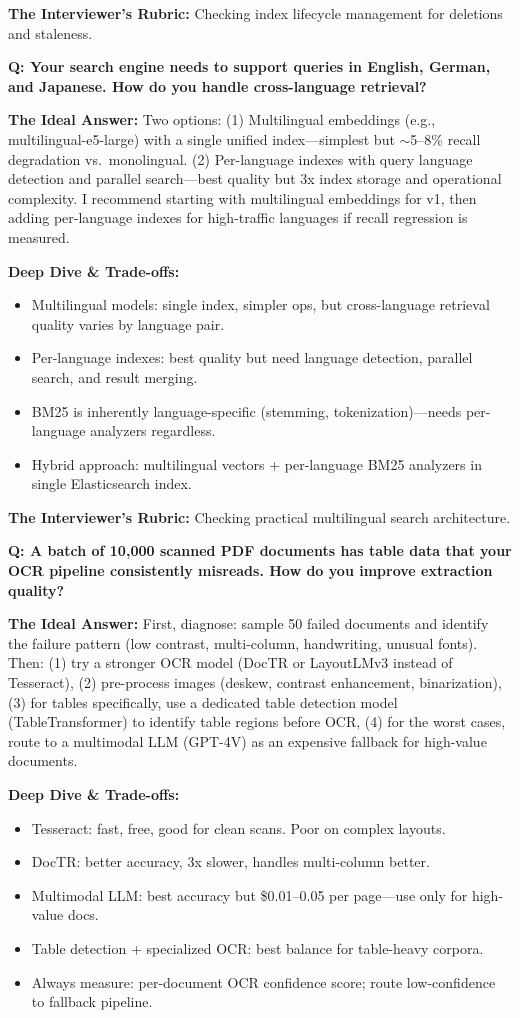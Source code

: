 \textbf{The Interviewer's Rubric:} Checking index lifecycle management for deletions and staleness.

\textbf{Q: Your search engine needs to support queries in English, German, and Japanese. How do you handle cross-language retrieval?}

\textbf{The Ideal Answer:} Two options: (1) Multilingual embeddings (e.g., multilingual-e5-large) with a single unified index---simplest but $\sim$5--8\% recall degradation vs.\ monolingual. (2) Per-language indexes with query language detection and parallel search---best quality but 3x index storage and operational complexity. I recommend starting with multilingual embeddings for v1, then adding per-language indexes for high-traffic languages if recall regression is measured.

\textbf{Deep Dive \& Trade-offs:}
\begin{itemize}
  \item Multilingual models: single index, simpler ops, but cross-language retrieval quality varies by language pair.
  \item Per-language indexes: best quality but need language detection, parallel search, and result merging.
  \item BM25 is inherently language-specific (stemming, tokenization)---needs per-language analyzers regardless.
  \item Hybrid approach: multilingual vectors + per-language BM25 analyzers in single Elasticsearch index.
\end{itemize}

\textbf{The Interviewer's Rubric:} Checking practical multilingual search architecture.

\textbf{Q: A batch of 10,000 scanned PDF documents has table data that your OCR pipeline consistently misreads. How do you improve extraction quality?}

\textbf{The Ideal Answer:} First, diagnose: sample 50 failed documents and identify the failure pattern (low contrast, multi-column, handwriting, unusual fonts). Then: (1) try a stronger OCR model (DocTR or LayoutLMv3 instead of Tesseract), (2) pre-process images (deskew, contrast enhancement, binarization), (3) for tables specifically, use a dedicated table detection model (TableTransformer) to identify table regions before OCR, (4) for the worst cases, route to a multimodal LLM (GPT-4V) as an expensive fallback for high-value documents.

\textbf{Deep Dive \& Trade-offs:}
\begin{itemize}
  \item Tesseract: fast, free, good for clean scans. Poor on complex layouts.
  \item DocTR: better accuracy, 3x slower, handles multi-column better.
  \item Multimodal LLM: best accuracy but \$0.01--0.05 per page---use only for high-value docs.
  \item Table detection + specialized OCR: best balance for table-heavy corpora.
  \item Always measure: per-document OCR confidence score; route low-confidence to fallback pipeline.
\end{itemize}

